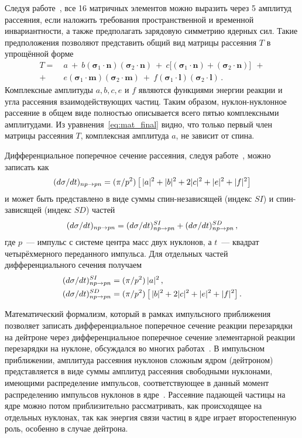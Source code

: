 Следуя работе~\cite{gold66}, все 16 матричных элементов можно выразить через 5
амплитуд рассеяния, если наложить требования пространственной и временной
инвариантности, а также предполагать зарядовую симметрию ядерных сил. Такие
предположения позволяют представить общий вид матрицы рассеяния $T$ в упрощённой
форме
\begin{equation}
  \label{eq:mat_final}
  \begin{split}
    T =\ &a\ +\ b
    (\boldsymbol{\sigma}_1\cdot\mathbf{n})
    (\boldsymbol{\sigma}_2\cdot\mathbf{n})\ +\ c\bigl[
    (\boldsymbol{\sigma}_1\cdot\mathbf{n}) +
    (\boldsymbol{\sigma}_2\cdot\mathbf{n})\bigr]\ \ +\\
    +\ &e
    (\boldsymbol{\sigma}_1\cdot\mathbf{m})
    (\boldsymbol{\sigma}_2\cdot\mathbf{m})\ +\ f
    (\boldsymbol{\sigma}_1\cdot\mathbf{l})
    (\boldsymbol{\sigma}_2\cdot\mathbf{l})\,.
  \end{split}
\end{equation}
Комплексные амплитуды $a, b, c, e$ и $f$ являются функциями энергии реакции и
угла рассеяния взаимодействующих частиц. Таким образом, нуклон-нуклонное
рассеяние в общем виде полностью описывается всего пятью комплексными
амплитудами. Из уравнения~\eqref{eq:mat_final} видно, что только первый член
матрицы рассеяния $T$, комплексная амплитуда $a$, не зависит от спина.

Дифференциальное поперечное сечение \np рассеяния, следуя работе~\cite{bys78_2},
можно записать как
\begin{equation}
  (d\sigma/dt)_{np \rightarrow pn} = (\pi/p^2)\,
  \bigl[\,|a|^2 + |b|^2 + 2|c|^2 + |e|^2 + |f|^2 \bigr]
\end{equation}
и может быть представлено в виде суммы спин-независящей (индекс $SI$) и
спин-зависящей (индекс $SD$) частей
\begin{equation}
  (d\sigma/dt)_{np \rightarrow pn} = (d\sigma/dt)^{SI}_{np \rightarrow pn} + (d\sigma/dt)^{SD}_{np \rightarrow pn}\,,
\end{equation}
где $p$~--- импульс с системе центра масс двух нуклонов, а $t$~--- квадрат
четырёхмерного переданного импульса. Для отдельных частей дифференциального
сечения получаем
\begin{align}
  (d\sigma/dt)^{SI}_{np \rightarrow pn} &= (\pi/p^2)\,|a|^2\,,\\
  \label{eq:np_SD}
  (d\sigma/dt)^{SD}_{np \rightarrow pn} &= (\pi/p^2)\,
  \bigl[\,|b|^2 + 2|c|^2 + |e|^2 + |f|^2\bigr]\,.
\end{align}

Математический формализм, который в рамках импульсного приближения позволяет
записать дифференциальное поперечное сечение реакции перезарядки на дейтроне
через дифференциальное поперечное сечение элементарной реакции перезарядки
на нуклоне, обсуждался во многих работах~\cite{dean72,dean72_2,bugg87}.
В импульсном приближении, амплитуда рассеяния нуклонов сложным ядром (дейтроном)
представляется в виде суммы амплитуд рассеяния свободными нуклонами, имеющими
распределение импульсов, соответствующее в данный момент распределению импульсов
нуклонов в ядре~\cite{chew50,chew52}. Рассеяние падающей частицы на ядре можно
потом приблизительно рассматривать, как происходящее на отдельных нуклонах, так
как энергия связи частиц в ядре играет второстепенную роль, особенно в случае
дейтрона.

